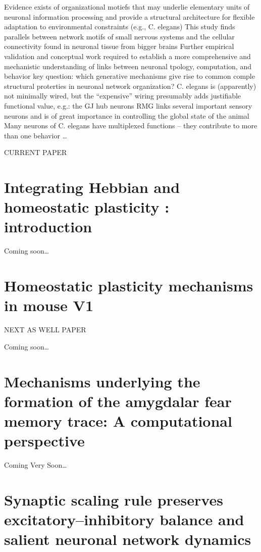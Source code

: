\documentclass[11pt, a4paper, oneside]{article}   	%
\begin{document}
\begin{outline}
   \point Evidence exists of organizational motiefs that may underlie elementary units of neuronal information processing and provide a structural architecture for flexible adaptation to environmental constraints (e.g., C. elegans)
    \point This study finds parallels between network motifs of small nervous systems and the cellular connectivity found in neuronal tissue from bigger brains
        \subpoint Further empirical validation and conceptual work required to establish a more comprehensive and mechanistic understanding of links between neuronal tpology, computation, and behavior
    \point key question: which generative mechanisms give rise to common comple structural proterties in neuronal network organization?
    \point C. elegans is (apparently) not minimally wired, but the ``expensive'' wiring presumably adds justifiable functional value, e.g.:
        \subpoint the GJ hub neurons RMG links several important sensory neurons and is of great importance in controlling the global state of the animal
    \point Many neurons of C. elegans have multiplexed functions -- they contribute to more than one behavior
    \point  \ldots

    CURRENT PAPER

\end{outline}

\section{Integrating Hebbian and homeostatic plasticity : introduction \cite{Fox2017}}


Coming soon\ldots

\section{Homeostatic plasticity mechanisms in mouse V1 \cite{Kaneko2017}}

NEXT AS WELL PAPER 

Coming soon\ldots

\section{Mechanisms underlying the formation of the amygdalar fear memory trace: A computational perspective \cite{Feng2016}}

Coming Very Soon\ldots

\section{Synaptic scaling rule preserves excitatory–inhibitory balance and salient neuronal network dynamics \cite{Barral2016}}
\end{document}
